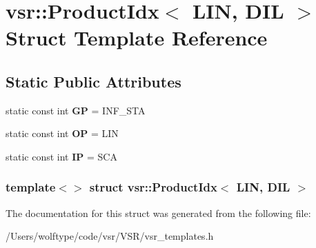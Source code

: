 \hypertarget{structvsr_1_1_product_idx_3_01_l_i_n_00_01_d_i_l_01_4}{\section{vsr\-:\-:Product\-Idx$<$ L\-I\-N, D\-I\-L $>$ Struct Template Reference}
\label{structvsr_1_1_product_idx_3_01_l_i_n_00_01_d_i_l_01_4}
}
\subsection*{Static Public Attributes}
\begin{DoxyCompactItemize}
\item 
\hypertarget{structvsr_1_1_product_idx_3_01_l_i_n_00_01_d_i_l_01_4_a9753780017e80052bcb00ce4514ad78c}{static const int {\bfseries G\-P} = I\-N\-F\-\_\-\-S\-T\-A}\label{structvsr_1_1_product_idx_3_01_l_i_n_00_01_d_i_l_01_4_a9753780017e80052bcb00ce4514ad78c}

\item 
\hypertarget{structvsr_1_1_product_idx_3_01_l_i_n_00_01_d_i_l_01_4_a32d29c846194405dac886b5d2859c911}{static const int {\bfseries O\-P} = L\-I\-N}\label{structvsr_1_1_product_idx_3_01_l_i_n_00_01_d_i_l_01_4_a32d29c846194405dac886b5d2859c911}

\item 
\hypertarget{structvsr_1_1_product_idx_3_01_l_i_n_00_01_d_i_l_01_4_a652e6306a3931691b27028f9b6726613}{static const int {\bfseries I\-P} = S\-C\-A}\label{structvsr_1_1_product_idx_3_01_l_i_n_00_01_d_i_l_01_4_a652e6306a3931691b27028f9b6726613}

\end{DoxyCompactItemize}
\subsubsection*{template$<$$>$ struct vsr\-::\-Product\-Idx$<$ L\-I\-N, D\-I\-L $>$}



The documentation for this struct was generated from the following file\-:\begin{DoxyCompactItemize}
\item 
/\-Users/wolftype/code/vsr/\-V\-S\-R/vsr\-\_\-templates.\-h\end{DoxyCompactItemize}
